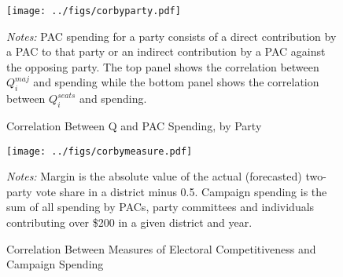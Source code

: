 \documentclass[12pt,final,fleqn]{article}
\theoremstyle{plain}
\begin{document}
\iffalse
\begin{figure}[!htb]
\begin{center}
\texttt{[image: ../figs/brier2010\_bypollfreq.pdf]}
\vspace{.5cm}
\caption{Brier Score By Polling Availability and Forecast Date}
\label{fig:Brier Score By Polling Availability and Forecast Date}
\begin{minipage}{\linewidth}
\footnotesize
\end{minipage}
\end{center}
\end{figure}
\fi

\begin{figure}[!htb]
\texttt{[image: ../figs/corbyparty.pdf]}
\vspace{.5cm}
\caption{Correlation Between Q and PAC Spending, by Party}
\label{fig:cor-q-party}
\begin{minipage}{\linewidth}
\footnotesize
\emph{Notes:} PAC spending for a party consists of a direct contribution by a PAC to that party or an indirect contribution by a PAC against the opposing party. The top panel shows the correlation between $Q_i^{maj}$ and spending while the bottom panel shows the correlation between $Q_i^{seats}$ and spending.
\end{minipage}
\end{figure}

\begin{figure}[!htb]
\texttt{[image: ../figs/corbymeasure.pdf]}
\vspace{.5cm}
\caption{Correlation Between Measures of Electoral Competitiveness and Campaign Spending}
\label{fig:Correlation Between Measures of Electoral Competitiveness and Campaign Spending}
\begin{minipage}{\linewidth}
\footnotesize
\emph{Notes:} Margin is the absolute value of the actual (forecasted) two-party vote share in a district minus 0.5. Campaign spending is the sum of all spending by PACs, party committees and individuals contributing over \$200 in a given district and year.
\end{minipage}
\end{figure}



\end{document}
